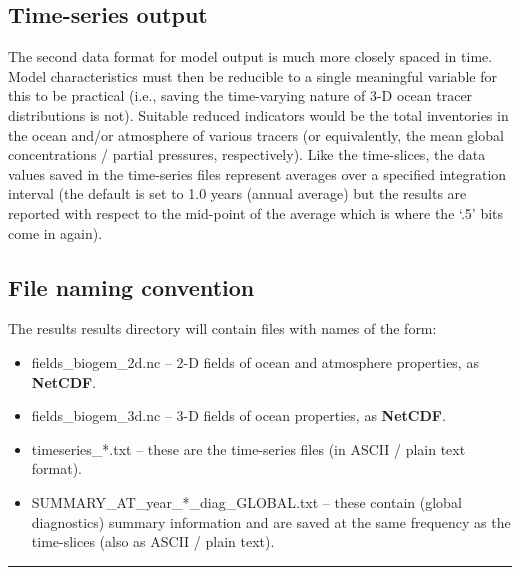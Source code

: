 \subsection{Time-series output}

The second data format for model output is much more closely spaced in time. Model characteristics must then be reducible to a single meaningful variable for this to be practical (i.e., saving the time-varying nature of 3-D ocean tracer distributions is not). Suitable reduced indicators would be the total inventories in the ocean and/or atmosphere of various tracers (or equivalently, the mean global concentrations / partial pressures, respectively). Like the time-slices, the data values saved in the time-series files represent averages over a specified integration interval (the default is set to 1.0 years (annual average) but the results are reported with respect to the mid-point of the average which is where the ‘.5’ bits come in again).


\subsection{File naming convention}

The \textsf{\footnotesize results} results directory will contain files with names of the form:

\vspace{1mm}
\begin{itemize}[noitemsep]
\setlength{\itemindent}{.2in}
\item \textsf{\footnotesize fields\_biogem\_2d.nc} – 2-D fields of ocean and atmosphere properties, as \textbf{NetCDF}.
\item \textsf{\footnotesize fields\_biogem\_3d.nc} – 3-D fields of ocean properties, as \textbf{NetCDF}.
\item \textsf{\footnotesize timeseries\_*.txt} – these are the time-series files (in ASCII / plain text format).
\item \textsf{\footnotesize SUMMARY\_AT\_year\_*\_diag\_GLOBAL.txt} – these contain (global diagnostics) summary information and are saved at the same frequency as the time-slices (also as ASCII / plain text).
\end{itemize}
\vspace{1mm}

\vspace{1mm}
\noindent\rule{4cm}{0.1mm}

